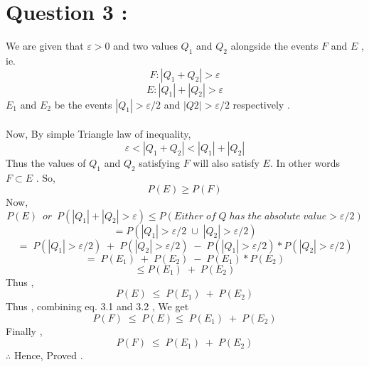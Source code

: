 \documentclass[11pt,a4paper,titlepage]{article}
\begin{document}
{\section{Question 3 : }{
We are given that $\varepsilon > 0$ and two values $Q_1$ and $Q_2$ alongside the events $F$ and $E$ , ie.
\[ F : |Q_1 + Q_2| >\varepsilon \]
\[ E : |Q_1| + |Q_2| > \varepsilon \]
$E_1$ and $E_2$ be the events $|Q_1| > \varepsilon/2$  and  $|Q2| > \varepsilon/2$ respectively .
\\\\Now, By simple Triangle law of inequality, 
\[ \varepsilon < |Q_1 + Q_2| < |Q_1|+|Q_2|\]
Thus the values of $Q_1$ and $Q_2$ satisfying $F$ will also satisfy $E$. 
In other words \, $ F \subset  E$ . So,
\\ 
\begin{equation}{
P(E) \geqslant P(F) 
}
\end{equation}
Now,
$$P(E) \, \, \, or \, \, \, P(|Q_1|+|Q_2|> \varepsilon) \leqslant P(Either \; of \; Q \; has\; the\; absolute\; value > \varepsilon/2) $$
$$=P(|Q_1| > \varepsilon/2 \; \cup \;|Q_2| > \varepsilon/2)$$
$$ = \; P(|Q_1| > \varepsilon/2) \; + \; P(|Q_2| > \varepsilon/2) \; - \; P(|Q_1| > \varepsilon/2)*P(|Q_2| > \varepsilon/2)$$
$$ = \; P(E_1) \; + \; P(E_2) \; - \; P(E_1)*P(E_2)$$
$$ \leqslant P(E_1) \; +\; P(E_2) $$
Thus ,
\begin{equation}
    P(E) \; \leqslant \; P(E_1) \;+ \; P(E_2)
\end{equation}
Thus , combining eq. 3.1 and 3.2 , We get
$$P(F) \; \leqslant \; P(E) \leqslant  \; P(E_1) \;+ \; P(E_2)$$
Finally ,
$$P(F) \; \leqslant  \; P(E_1) \;+ \; P(E_2)$$
$\therefore$ \; Hence, Proved .
}
\newpage







}
\end{document}

